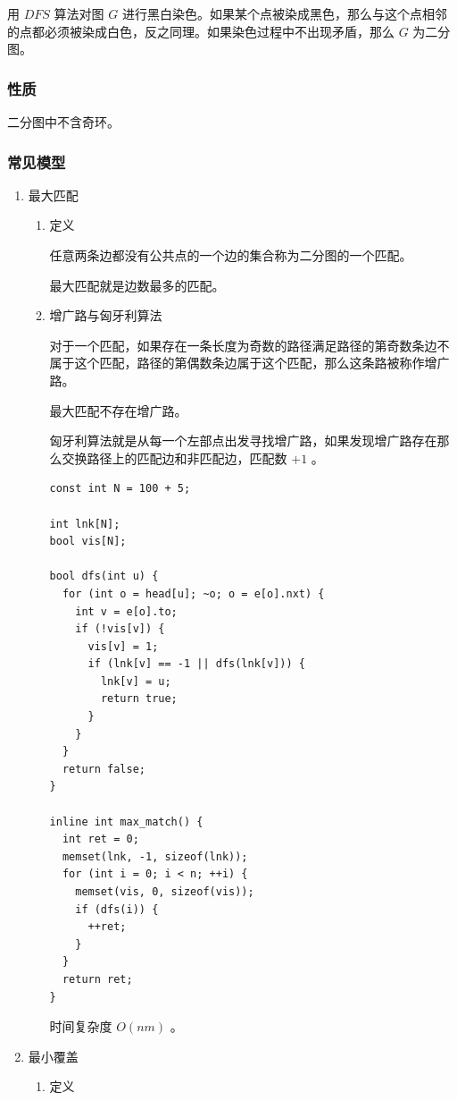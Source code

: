 \documentclass[11pt]{article}
\begin{document}
用 $DFS$ 算法对图 $G$ 进行黑白染色。如果某个点被染成黑色，那么与这个点相邻的点都必须被染成白色，反之同理。如果染色过程中不出现矛盾，那么 $G$ 为二分图。

\subsubsection{性质}
\label{sec-6-3-3}

二分图中不含奇环。

\subsubsection{常见模型}
\label{sec-6-3-4}
\begin{enumerate}
\item 最大匹配
\label{sec-6-3-4-1}
\begin{enumerate}
\item 定义
\label{sec-6-3-4-1-1}

任意两条边都没有公共点的一个边的集合称为二分图的一个匹配。

最大匹配就是边数最多的匹配。

\item 增广路与匈牙利算法
\label{sec-6-3-4-1-2}

对于一个匹配，如果存在一条长度为奇数的路径满足路径的第奇数条边不属于这个匹配，路径的第偶数条边属于这个匹配，那么这条路被称作增广路。

最大匹配不存在增广路。

匈牙利算法就是从每一个左部点出发寻找增广路，如果发现增广路存在那么交换路径上的匹配边和非匹配边，匹配数 $+1$ 。

\begin{verbatim}
const int N = 100 + 5;

int lnk[N];
bool vis[N];

bool dfs(int u) {
  for (int o = head[u]; ~o; o = e[o].nxt) {
    int v = e[o].to;
    if (!vis[v]) {
      vis[v] = 1;
      if (lnk[v] == -1 || dfs(lnk[v])) {
        lnk[v] = u;
        return true;
      }
    }
  }
  return false;
}

inline int max_match() {
  int ret = 0;
  memset(lnk, -1, sizeof(lnk));
  for (int i = 0; i < n; ++i) {
    memset(vis, 0, sizeof(vis));
    if (dfs(i)) {
      ++ret;
    }
  }
  return ret;
}
\end{verbatim}

时间复杂度 $O(nm)$ 。
\end{enumerate}

\item 最小覆盖
\label{sec-6-3-4-2}
\begin{enumerate}
\item 定义
\label{sec-6-3-4-2-1}


\end{enumerate}
\end{enumerate}
\end{document}
